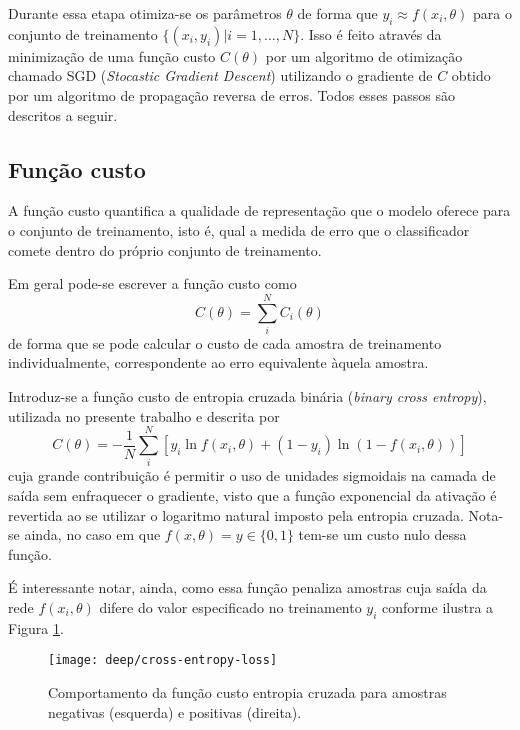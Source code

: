 Durante essa etapa otimiza-se os parâmetros $\theta$ de forma que $y_i \approx f(x_i, \theta)$ para o conjunto de treinamento $\{ (x_i, y_i) | i=1,\dots,N \}$. Isso é feito através da minimização de uma função custo $C(\theta)$ por um algoritmo de otimização chamado SGD (\textit{Stocastic Gradient Descent}) utilizando o gradiente de $C$ obtido por um algoritmo de propagação reversa de erros. Todos esses passos são descritos a seguir.

\subsection{Função custo}
A função custo quantifica a qualidade de representação que o modelo oferece para o conjunto de treinamento, isto é, qual a medida de erro que o classificador comete dentro do próprio conjunto de treinamento.

Em geral pode-se escrever a função custo como
\begin{equation}
C(\theta) = \sum_i^N C_i(\theta)
\end{equation}
de forma que se pode calcular o custo de cada amostra de treinamento individualmente, correspondente ao erro equivalente àquela amostra.

Introduz-se a função custo de entropia cruzada binária (\textit{binary cross entropy}), utilizada no presente trabalho e descrita por
\begin{equation}
\label{eq:bcr}
C(\theta) = -\frac{1}{N} \sum_i^N \left[y_i \ln f(x_i,\theta) + (1-y_i) \ln (1-f(x_i,\theta))\right]
\end{equation}
cuja grande contribuição é permitir o uso de unidades sigmoidais na camada de saída sem enfraquecer o gradiente, visto que a função exponencial da ativação é revertida ao se utilizar o logaritmo natural imposto pela entropia cruzada. Nota-se ainda, no caso em que $f(x,\theta)=y \in \{0, 1\}$ tem-se um custo nulo dessa função.

É interessante notar, ainda, como essa função penaliza amostras cuja saída da rede $f(x_i,\theta)$ difere do valor especificado no treinamento $y_i$ conforme ilustra a Figura \ref{fig:plot-cost}.

\begin{figure}
\centering
\texttt{[image: deep/cross-entropy-loss]}
\caption{Comportamento da função custo entropia cruzada para amostras negativas (esquerda) e positivas (direita).}
\label{fig:plot-cost}
\end{figure}

